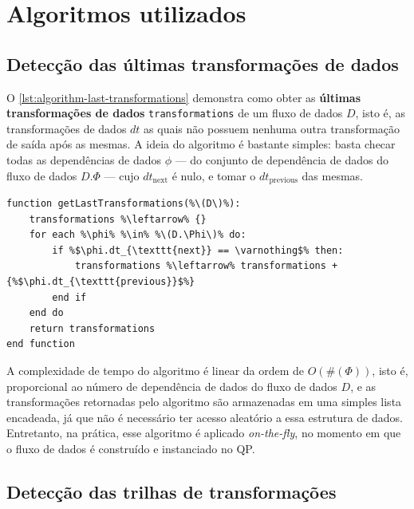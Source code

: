 \section{Algoritmos utilizados}

\subsection{Detecção das últimas transformações de dados}

O \autoref{lst:algorithm-last-transformations} demonstra como obter as \textbf{últimas transformações de dados} \texttt{transformations} de um fluxo de dados \( D \), isto é, as transformações de dados \(dt\) as quais não possuem nenhuma outra transformação de saída após as mesmas. A ideia do algoritmo é bastante simples: basta checar todas as dependências de dados \( \phi \) --- do conjunto de dependência de dados do fluxo de dados \( D.\Phi \) --- cujo \( dt_{\textrm{next}} \) é nulo, e tomar o \( dt_{\textrm{previous}} \) das mesmas.

\begin{minipage}[c]{0.95\textwidth}
\begin{lstlisting}[language=pseudocode,label={lst:algorithm-last-transformations},caption={[Detecção das últimas transformações de dados]Detecção das útimas transformações de dados em uma especificação de fluxo de dados.}]
function getLastTransformations(%\(D\)%):
    transformations %\leftarrow% {}
    for each %\phi% %\in% %\(D.\Phi\)% do:
        if %$\phi.dt_{\texttt{next}} == \varnothing$% then:
            transformations %\leftarrow% transformations + {%$\phi.dt_{\texttt{previous}}$%}
        end if
    end do
    return transformations
end function
\end{lstlisting}
\end{minipage}

A complexidade de tempo do algoritmo é linear da ordem de \( O(\#(\Phi)) \), isto é, proporcional ao número de dependência de dados do fluxo de dados \( D \), e as transformações retornadas pelo algoritmo são armazenadas em uma simples lista encadeada, já que não é necessário ter acesso aleatório a essa estrutura de dados. Entretanto, na prática, esse algoritmo é aplicado \textit{on-the-fly}, no momento em que o fluxo de dados é construído e instanciado no QP.

\subsection{Detecção das trilhas de transformações}%
\label{subsec:deteccao-das-trilhas-de-transformacoes}

